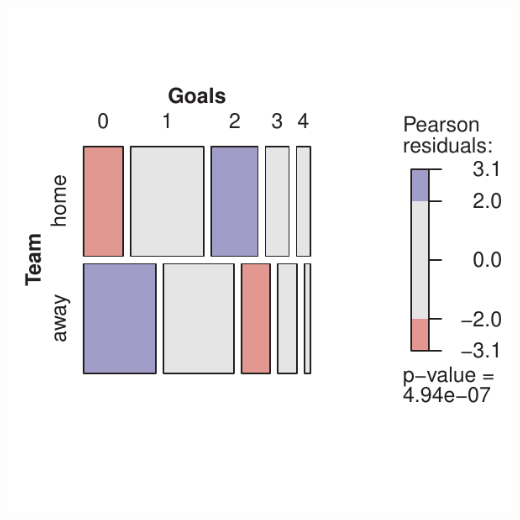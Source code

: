 \documentclass[11pt]{report}\usepackage[]{graphicx}\usepackage[]{color}
\newenvironment{knitrout}{}{} %
\renewenvironment{knitrout}{\small\renewcommand{\baselinestretch}{.85}}{} %
\begin{document}
\begin{Exercises}
\begin{enumerate*}
\begin{ans}
\begin{knitrout}
\centerline{\includegraphics{soln/fig/ex2_5d-mosaic-1} }



\end{knitrout}
    \end{ans}
    

  \end{enumerate*}


\end{Exercises}
\end{document}
